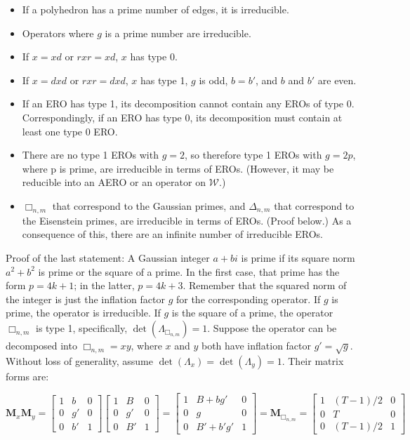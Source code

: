 \documentclass{amsart}[12pt]
\begin{document}
\begin{itemize}
\item If a polyhedron has a prime number of edges, it is irreducible.
\item Operators where $g$ is a prime number are irreducible.
\item If $x=xd$ or $rxr=xd$, $x$ has type 0.
\item If $x=dxd$ or $rxr=dxd$, $x$ has type 1, $g$ is odd, $b=b'$, and $b$ and $b'$ are even.
\item If an ERO has type 1, its decomposition cannot contain any EROs of type 0. Correspondingly, if an ERO has type 0, its decomposition must contain at least one type 0 ERO.
\item There are no type 1 EROs with $g=2$, so therefore type 1 EROs
  with $g=2p$, where p is prime, are irreducible in terms of EROs.
  (However, it may be reducible into an AERO or an operator on $\mathcal{W}$.)
\item $\Box_{n,m}$ that correspond to the Gaussian primes,
  and $\Delta_{n,m}$ that correspond to the Eisenstein primes,
  are irreducible in terms of EROs. (Proof below.)
  As a consequence of this, there are an infinite number of irreducible EROs.
\end{itemize}

Proof of the last statement: A Gaussian integer $a + bi$ is prime if its
square norm $a^2 + b^2$ is prime or the square of a prime. In the first
case, that prime has the form $p=4k+1$; in the latter, $p=4k+3$.
Remember that the squared norm of the integer is just the inflation factor $g$
for the corresponding operator. If $g$ is prime, the operator is irreducible.
If $g$ is the square of a prime, the operator $\Box_{n,m}$ is type 1,
specifically, $\det(\Lambda_{\Box_{n,m}}) = 1$. Suppose the operator can
be decomposed into $\Box_{n,m} = xy$, where $x$ and $y$ both have
inflation factor $g' = \sqrt{g}$. Without loss of generality, assume
$\det(\Lambda_x) = \det(\Lambda_y) = 1$. Their matrix forms are:

\begin{equation}
   \mathbf{M}_x \mathbf{M}_y = \begin{bmatrix}
   1 & b & 0 \\
   0 & g' & 0 \\
   0 & b' & 1 \end{bmatrix} \begin{bmatrix}
   1 & B & 0 \\
   0 & g' & 0 \\
   0 & B' & 1 \end{bmatrix}
   = \begin{bmatrix}
   1 & B+bg' & 0 \\
   0 & g & 0 \\
   0 & B'+b'g' & 1 \end{bmatrix}
   = \mathbf{M}_{\Box_{n,m}} = \begin{bmatrix}
   1 & (T-1)/2 & 0 \\
   0 & T & 0 \\
   0 & (T-1)/2 & 1 \end{bmatrix}
\end{equation}
\end{document}
